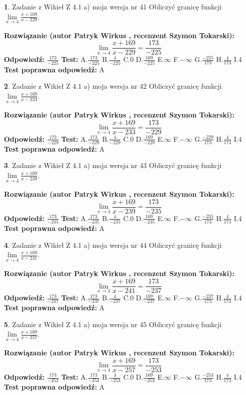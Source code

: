 \documentclass[12pt, a4paper]{article}
\theoremstyle{definition} %
\newtheorem{zad}{}
\newcommand{\zadStart}[1]{\begin{zad}#1\newline}
\newcommand{\zadStop}{\end{zad}}
\newcommand{\rozwStart}[2]{\noindent \textbf{Rozwiązanie (autor #1 , recenzent #2): }\newline}
\newcommand{\rozwStop}{\newline}
\newcommand{\odpStart}{\noindent \textbf{Odpowiedź:}\newline}
\newcommand{\odpStop}{\newline}
\newcommand{\testStart}{\noindent \textbf{Test:}\newline}
\newcommand{\testStop}{\newline}
\newcommand{\kluczStart}{\noindent \textbf{Test poprawna odpowiedź:}\newline}
\newcommand{\kluczStop}{\newline}
\begin{document}
\zadStart{Zadanie z Wikieł Z 4.1 a) moja wersja nr 41}
Obliczyć granicę funkcji $\lim\limits_{x\to4}\frac{x+169}{x-229}$.
\zadStop
\rozwStart{Patryk Wirkus}{Szymon Tokarski}
$$\lim\limits_{x\to4}\frac{x+169}{x-229} = \frac{173}{-225}$$
\rozwStop
\odpStart
$\frac{173}{-225}$
\odpStop
\testStart
A.$\frac{173}{-225}$
B.$\frac{4}{-225}$
C.$0$
D.$\frac{169}{-225}$
E.$\infty$
F.$-\infty$
G.$\frac{-225}{173}$
H.$\frac{4}{173}$
I.$4$
\testStop
\kluczStart
A
\kluczStop



\zadStart{Zadanie z Wikieł Z 4.1 a) moja wersja nr 42}
Obliczyć granicę funkcji $\lim\limits_{x\to4}\frac{x+169}{x-233}$.
\zadStop
\rozwStart{Patryk Wirkus}{Szymon Tokarski}
$$\lim\limits_{x\to4}\frac{x+169}{x-233} = \frac{173}{-229}$$
\rozwStop
\odpStart
$\frac{173}{-229}$
\odpStop
\testStart
A.$\frac{173}{-229}$
B.$\frac{4}{-229}$
C.$0$
D.$\frac{169}{-229}$
E.$\infty$
F.$-\infty$
G.$\frac{-229}{173}$
H.$\frac{4}{173}$
I.$4$
\testStop
\kluczStart
A
\kluczStop



\zadStart{Zadanie z Wikieł Z 4.1 a) moja wersja nr 43}
Obliczyć granicę funkcji $\lim\limits_{x\to4}\frac{x+169}{x-239}$.
\zadStop
\rozwStart{Patryk Wirkus}{Szymon Tokarski}
$$\lim\limits_{x\to4}\frac{x+169}{x-239} = \frac{173}{-235}$$
\rozwStop
\odpStart
$\frac{173}{-235}$
\odpStop
\testStart
A.$\frac{173}{-235}$
B.$\frac{4}{-235}$
C.$0$
D.$\frac{169}{-235}$
E.$\infty$
F.$-\infty$
G.$\frac{-235}{173}$
H.$\frac{4}{173}$
I.$4$
\testStop
\kluczStart
A
\kluczStop



\zadStart{Zadanie z Wikieł Z 4.1 a) moja wersja nr 44}
Obliczyć granicę funkcji $\lim\limits_{x\to4}\frac{x+169}{x-241}$.
\zadStop
\rozwStart{Patryk Wirkus}{Szymon Tokarski}
$$\lim\limits_{x\to4}\frac{x+169}{x-241} = \frac{173}{-237}$$
\rozwStop
\odpStart
$\frac{173}{-237}$
\odpStop
\testStart
A.$\frac{173}{-237}$
B.$\frac{4}{-237}$
C.$0$
D.$\frac{169}{-237}$
E.$\infty$
F.$-\infty$
G.$\frac{-237}{173}$
H.$\frac{4}{173}$
I.$4$
\testStop
\kluczStart
A
\kluczStop



\zadStart{Zadanie z Wikieł Z 4.1 a) moja wersja nr 45}
Obliczyć granicę funkcji $\lim\limits_{x\to4}\frac{x+169}{x-257}$.
\zadStop
\rozwStart{Patryk Wirkus}{Szymon Tokarski}
$$\lim\limits_{x\to4}\frac{x+169}{x-257} = \frac{173}{-253}$$
\rozwStop
\odpStart
$\frac{173}{-253}$
\odpStop
\testStart
A.$\frac{173}{-253}$
B.$\frac{4}{-253}$
C.$0$
D.$\frac{169}{-253}$
E.$\infty$
F.$-\infty$
G.$\frac{-253}{173}$
H.$\frac{4}{173}$
I.$4$
\testStop
\kluczStart
A
\kluczStop
\end{document}
